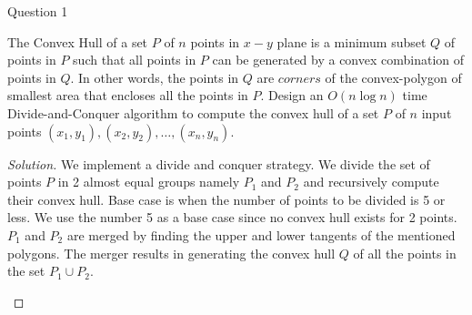 \begin{solution}{Question 1}\label{ques:1}
    \begin{question}
    The Convex Hull of a set $P$ of $n$ points in $x-y$ plane is a minimum subset $Q$ of points in $P$ such that all points in $P$ can be generated by a convex combination of points in $Q$. In other words, the points in $Q$ are $corners$ of the convex-polygon of smallest area that encloses all the points in $P$. Design an $O(n \log n)$ time Divide-and-Conquer algorithm to compute the convex hull of a set $P$ of $n$ input points ${(x_1, y_1), (x_2, y_2), \ldots, (x_n, y_n)}$.
    \end{question}
    \tcblower{}
    \begin{proof}[Solution]
        We implement a divide and conquer strategy. We divide the set of points $P$ in 2 almost equal groups namely $P_1$ and $P_2$ and recursively compute their convex hull. Base case is when the number of points to be divided is 5 or less. We use the number 5 as a base case since no convex hull exists for 2 points. $P_1$ and $P_2$ are merged by finding the upper and lower tangents of the mentioned polygons. The merger results in generating the convex hull $Q$ of all the points in the set $P_1 \cup P_2$.
        \begin{algorithm}[H]
            \caption{Merge algorithm for divide and conquer solution for convex hull} \label{alg:d_c_c_h_m}
            \begin{algorithmic}[1]
                 
                    \EndIf{}
                \EndFor{}
                 
                    \EndIf{}
                \EndFor{}
                 
                         
                    \EndWhile{}
                         
                    \EndWhile{}
                \EndWhile{}
                    

\end{algorithmic}
\end{algorithm}
\end{proof}
\end{solution}
